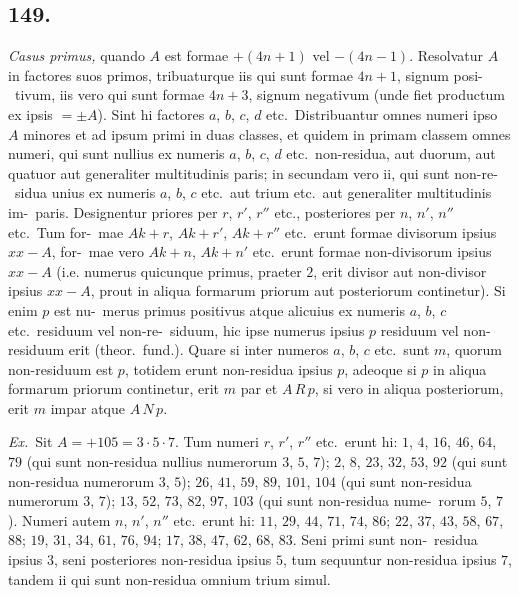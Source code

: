 \documentclass[12pt,a4paper]{article}
\theoremstyle{plain}
\theoremstyle{definition}
\theoremstyle{remark}
\begin{document}
\subsection*{149.}

\emph{Casus primus,} quando $A$ est formae $+(4n+1)$ vel $-(4n-1)$. Resolvatur
$A$ in factores suos primos, tribuaturque iis qui sunt formae $4n+1$, signum posi-\ tivum, iis vero qui sunt formae $4n+3$, signum negativum (unde fiet productum
ex ipsis $= \pm A$). Sint hi factores $a$, $b$, $c$, $d$ etc.\ Distribuantur omnes numeri ipso
$A$ minores et ad ipsum primi in duas classes, et quidem in primam classem omnes
numeri, qui sunt nullius ex numeris $a$, $b$, $c$, $d$ etc.\ non-residua, aut duorum, aut
quatuor aut generaliter multitudinis paris; in secundam vero ii, qui sunt non-re-\ sidua unius ex numeris $a$, $b$, $c$ etc.\ aut trium etc.\ aut generaliter multitudinis im-\ paris. Designentur priores per $r$, $r'$, $r''$ etc., posteriores per $n$, $n'$, $n''$ etc.\ Tum for-\ mae $Ak + r$, $Ak + r'$, $Ak + r''$ etc.\ erunt formae divisorum ipsius $xx - A$, for-\ mae vero $Ak + n$, $Ak + n'$ etc.\ erunt formae non-divisorum ipsius $xx - A$ (i.e.
numerus quicunque primus, praeter $2$, erit divisor aut non-divisor ipsius $xx - A$,
prout in aliqua formarum priorum aut posteriorum continetur). Si enim $p$ est nu-\ merus primus positivus atque alicuius ex numeris $a$, $b$, $c$ etc.\ residuum vel non-re-\ siduum, hic ipse numerus ipsius $p$ residuum vel non-residuum erit (theor.\ fund.).
Quare si inter numeros $a$, $b$, $c$ etc.\ sunt $m$, quorum non-residuum est $p$, totidem
erunt non-residua ipsius $p$, adeoque si $p$ in aliqua formarum priorum continetur,
erit $m$ par et $A \, R \, p$, si vero in aliqua posteriorum, erit $m$ impar atque $A \, N \, p$.

\emph{Ex.}\ Sit $A = +105 = 3 \cdot 5 \cdot 7$. Tum numeri $r$, $r'$, $r''$ etc.\ erunt
hi: $1$, $4$, $16$, $46$, $64$, $79$ (qui sunt non-residua nullius numerorum $3$, $5$, $7$); $2$, $8$, $23$,
$32$, $53$, $92$ (qui sunt non-residua numerorum $3$, $5$); $26$, $41$, $59$, $89$, $101$, $104$ (qui sunt
non-residua numerorum $3$, $7$); $13$, $52$, $73$, $82$, $97$, $103$ (qui sunt non-residua nume-\ rorum $5$, $7$). Numeri autem $n$, $n'$, $n''$ etc.\ erunt hi: $11$, $29$, $44$, $71$, $74$, $86$; $22$,
$37$, $43$, $58$, $67$, $88$; $19$, $31$, $34$, $61$, $76$, $94$; $17$, $38$, $47$, $62$, $68$, $83$. Seni primi sunt non-\ residua ipsius $3$, seni posteriores non-residua ipsius $5$, tum sequuntur non-residua
ipsius $7$, tandem ii qui sunt non-residua omnium trium simul.
\end{document}
